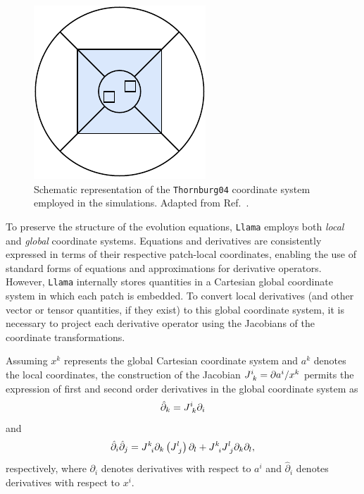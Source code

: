 \begin{figure}[h]
  \centering
  \includegraphics[width=0.60\linewidth]{img/wave_scattering/multipatch_coords}
  \caption{Schematic representation of the \texttt{Thornburg04} coordinate system employed in the simulations. Adapted from Ref.~\cite{Reisswig2010}.}
  \label{fig:wave_scattering_multipatch_coords}
\end{figure}

To preserve the structure of the evolution equations, \texttt{Llama} employs both \textit{local} and \textit{global} coordinate systems. Equations and derivatives are consistently expressed in terms of their respective patch-local coordinates, enabling the use of standard forms of equations and approximations for derivative operators. However, \texttt{Llama} internally stores quantities in a Cartesian global coordinate system in which each patch is embedded. To convert local derivatives (and other vector or tensor quantities, if they exist) to this global coordinate system, it is necessary to project each derivative operator using the Jacobians of the coordinate transformations.

Assuming $x^k$ represents the global Cartesian coordinate system and $a^k$ denotes the local coordinates, the construction of the Jacobian $\tens{J}{i}{k} = \partial a^i / x^k$ permits the expression of first and second order derivatives in the global coordinate system as
%
\begin{equation}
  \hat{\partial}_k = \tens{J}{i}{k} \partial_i
  \label{eq:wave_scattering_projection_1}
\end{equation}
%
and
%
\begin{equation}
  \hat{\partial}_i \hat{\partial}_j = \tens{J}{k}{i} \partial_k \left( \tens{J}{l}{j} \right) \partial_l + \tens{J}{k}{i}\tens{J}{l}{j}\partial_k\partial_l,
  \label{eq:wave_scattering_projection_2}
\end{equation}
%
respectively, where $\partial_i$ denotes derivatives with respect to $a^i$ and $\hat{\partial}_i$ denotes derivatives with respect to $x^i$.

